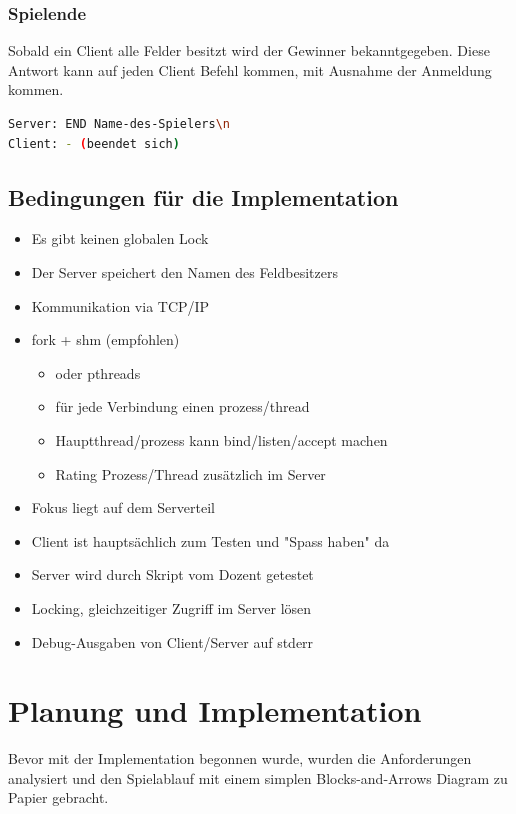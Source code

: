 \subsection{Spielende}
Sobald ein Client alle Felder besitzt wird der Gewinner bekanntgegeben. Diese Antwort kann auf jeden Client Befehl kommen, mit Ausnahme der Anmeldung kommen.
\begin{lstlisting}[language=bash,numbers=none,caption={Spielende}]
Server: END Name-des-Spielers\n
Client: - (beendet sich)
\end{lstlisting}

\section{Bedingungen für die Implementation}
\begin{itemize}
	\item Es gibt keinen globalen Lock
	\item Der Server speichert den Namen des Feldbesitzers
	\item Kommunikation via TCP/IP
	\item fork + shm (empfohlen)
	\begin{itemize}
		\item oder pthreads
		\item für jede Verbindung einen prozess/thread
		\item Hauptthread/prozess kann bind/listen/accept machen
		\item Rating Prozess/Thread zusätzlich im Server
	\end{itemize}
	\item Fokus liegt auf dem Serverteil
	\item Client ist hauptsächlich zum Testen und "Spass haben" da
	\item Server wird durch Skript vom Dozent getestet
	\item Locking, gleichzeitiger Zugriff im Server lösen
	\item Debug-Ausgaben von Client/Server auf stderr
\end{itemize}

\chapter{Planung und Implementation}
Bevor mit der Implementation begonnen wurde, wurden die Anforderungen analysiert und den Spielablauf mit einem simplen Blocks-and-Arrows Diagram zu Papier gebracht.

